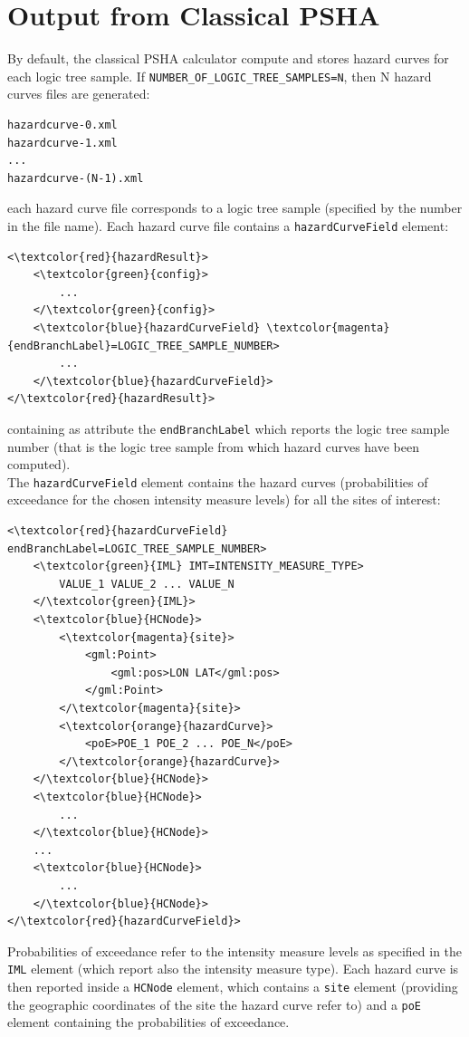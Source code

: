 \section{Output from Classical PSHA}
By default, the classical PSHA calculator compute and stores hazard curves for each logic tree sample. If \Verb+NUMBER_OF_LOGIC_TREE_SAMPLES=N+, then N hazard curves files are generated:
\begin{Verbatim}[frame=single, commandchars=\\\{\}, samepage=true]
hazardcurve-0.xml
hazardcurve-1.xml
...
hazardcurve-(N-1).xml
\end{Verbatim}
each hazard curve file corresponds to a logic tree sample (specified by the number in the file name).
Each hazard curve file contains a \Verb+hazardCurveField+ element:
\begin{Verbatim}[frame=single, commandchars=\\\{\}, samepage=true]
<\textcolor{red}{hazardResult}>
	<\textcolor{green}{config}>
		...
	</\textcolor{green}{config}>
	<\textcolor{blue}{hazardCurveField} \textcolor{magenta}{endBranchLabel}=LOGIC_TREE_SAMPLE_NUMBER>
		...
	</\textcolor{blue}{hazardCurveField}>
</\textcolor{red}{hazardResult}>
\end{Verbatim}
containing as attribute the \Verb+endBranchLabel+ which reports the logic tree sample number (that is the logic tree sample from which hazard curves have been computed).\\
The \Verb+hazardCurveField+ element contains the hazard curves (probabilities of exceedance for the chosen intensity measure levels) for all the sites of interest:
\begin{Verbatim}[frame=single, commandchars=\\\{\}, samepage=true]
<\textcolor{red}{hazardCurveField} endBranchLabel=LOGIC_TREE_SAMPLE_NUMBER>
	<\textcolor{green}{IML} IMT=INTENSITY_MEASURE_TYPE>
		VALUE_1 VALUE_2 ... VALUE_N
	</\textcolor{green}{IML}>
	<\textcolor{blue}{HCNode}>
		<\textcolor{magenta}{site}>
			<gml:Point>
				<gml:pos>LON LAT</gml:pos>
			</gml:Point>
		</\textcolor{magenta}{site}>
		<\textcolor{orange}{hazardCurve}>
			<poE>POE_1 POE_2 ... POE_N</poE>
		</\textcolor{orange}{hazardCurve}>
	</\textcolor{blue}{HCNode}>
	<\textcolor{blue}{HCNode}>
		...
	</\textcolor{blue}{HCNode}>
	...
	<\textcolor{blue}{HCNode}>
		...
	</\textcolor{blue}{HCNode}>
</\textcolor{red}{hazardCurveField}>
\end{Verbatim}
Probabilities of exceedance refer to the intensity measure levels as specified in the \Verb+IML+ element (which report also the intensity measure type). Each hazard curve is then reported inside a \Verb+HCNode+ element, which contains a \Verb+site+ element (providing the geographic coordinates of the site the hazard curve refer to) and a \Verb+poE+ element containing the probabilities of exceedance.\\
